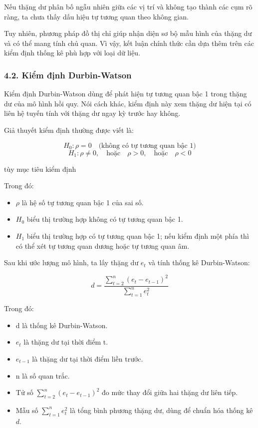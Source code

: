 Nếu thặng dư phân bố ngẫu nhiên giữa các vị trí và không tạo thành các cụm rõ ràng, ta chưa thấy dấu hiệu tự tương quan theo không gian.

Tuy nhiên, phương pháp đồ thị chỉ giúp nhận diện sơ bộ mẫu hình của thặng dư và có thể mang tính chủ quan. Vì vậy, kết luận chính thức cần dựa thêm trên các kiểm định thống kê phù hợp với loại dữ liệu.


\subsubsection{4.2. Kiểm định
Durbin-Watson}\label{kiux1ec3m-ux111ux1ecbnh-durbin-watson}

Kiểm định Durbin-Watson dùng để phát hiện tự tương quan bậc 1 trong
thặng dư của mô hình hồi quy. Nói cách khác, kiểm định này xem thặng dư
hiện tại có liên hệ tuyến tính với thặng dư ngay kỳ trước hay không.

Giả thuyết kiểm định thường được viết là:

\[
H_0:\rho=0 \quad \text{(không có tự tương quan bậc 1)}
\]
\[
H_1:\rho\neq 0,\quad \text{hoặc}\quad \rho>0,\quad \text{hoặc}\quad \rho<0
\]

tùy mục tiêu kiểm định

Trong đó:

\begin{itemize}
\item
  \(\rho\) là hệ số tự tương quan bậc 1 của sai số.
\item
  \(H_0\) biểu thị trường hợp không có tự tương quan bậc 1.
\item
  \(H_1\) biểu thị trường hợp có tự tương quan bậc 1; nếu kiểm định một phía
  thì có thể xét tự tương quan dương hoặc tự tương quan âm.
\end{itemize}

Sau khi ước lượng mô hình, ta lấy thặng dư \(e_t\) và tính thống kê
Durbin-Watson:

\[
d=\frac{\sum_{t=2}^{n}(e_t-e_{t-1})^2}{\sum_{t=1}^{n}e_t^2}
\]

Trong đó:

\begin{itemize}
\item
  d là thống kê Durbin-Watson.
\item
  \(e_t\) là thặng dư tại thời điểm t.
\item
  \(e_{t-1}\) là thặng dư tại thời điểm liền trước.
\item
  n là số quan trắc.
\item Tử số 
    $\sum_{t=2}^{n}(e_t - e_{t-1})^2$
    đo mức thay đổi giữa hai thặng dư liên tiếp.

\item Mẫu số 
    $\sum_{t=1}^{n} e_t^2$
    là tổng bình phương thặng dư, dùng để chuẩn hóa thống kê $d$.
\end{itemize}

